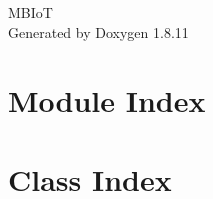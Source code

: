 \documentclass[twoside]{article}
\newcommand{\+}{\discretionary{\mbox{\scriptsize$\hookleftarrow$}}{}{}}
\begin{document}
\hypersetup{pageanchor=false,
             bookmarksnumbered=true,
             pdfencoding=unicode
            }
\begin{titlepage}
\vspace*{7cm}
\begin{center}%
{\Large M\+B\+IoT }\\
\vspace*{1cm}
{\large Generated by Doxygen 1.8.11}\\
\end{center}
\end{titlepage}
\tableofcontents
{}
\hypersetup{pageanchor=true}

\section{Module Index}

\section{Class Index}

\end{document}
